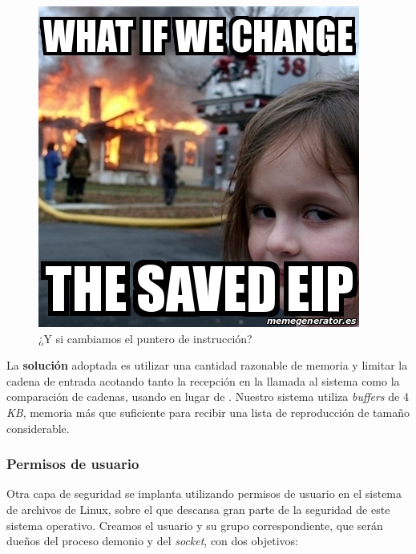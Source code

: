 \begin{figure}[H]
	\noindent \begin{centering}
		\includegraphics[width=\linewidth/3]{capitulo5/disaster_girl}
		\par\end{centering}
	\smallskip
	\caption{\label{fig:disaster_girl} ¿Y si cambiamos el puntero de instrucción?}
\end{figure} 

\smallskip

La \textbf{solución} adoptada es utilizar una cantidad razonable de memoria y limitar la cadena de entrada acotando tanto la recepción en la llamada al sistema  como la comparación de cadenas, usando  en lugar de . Nuestro sistema utiliza \textit{buffers} de 4 \textit{KB}, memoria más que suficiente para recibir una lista de reproducción de tamaño considerable.

\subsubsection{Permisos de usuario}

Otra capa de seguridad se implanta utilizando permisos de usuario en el sistema de archivos de Linux, sobre el que descansa gran parte de la seguridad de este sistema operativo. Creamos el usuario \textbf{} y su grupo correspondiente, que serán dueños del proceso demonio y del \textit{socket}, con dos objetivos:

